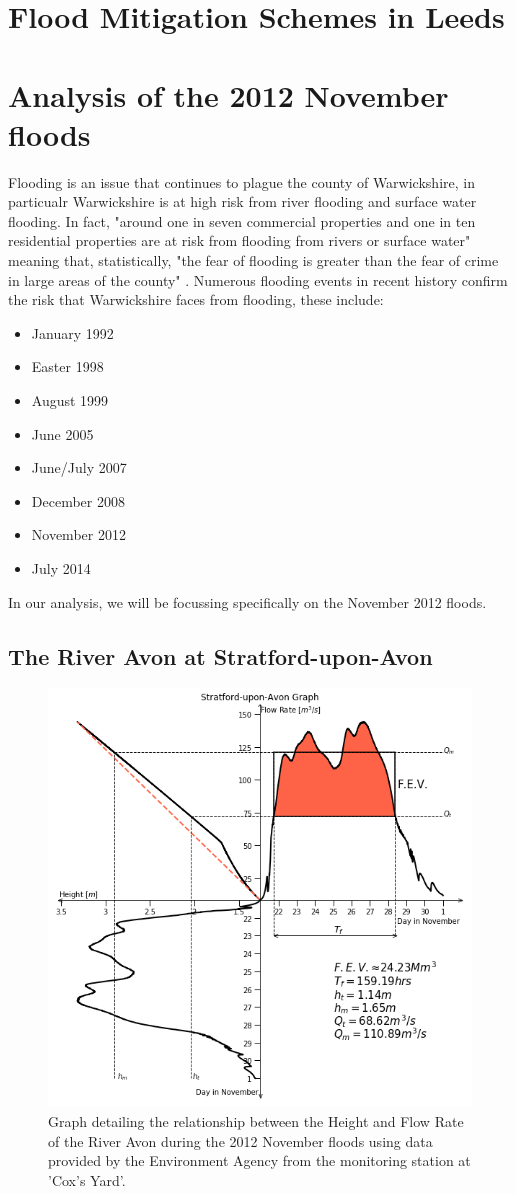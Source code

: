 \documentclass[11 pt, a4paper]{article}
\begin{document}
\newpage
\section{Flood Mitigation Schemes in Leeds}

\newpage
\section{Analysis of the 2012 November floods}
Flooding is an issue that continues to plague the county of Warwickshire, in particualr Warwickshire is at high risk from river flooding and surface water flooding. In fact, "around one in seven commercial properties and one in ten residential properties are at risk from flooding from rivers or surface water" \cite{5} meaning that, statistically, "the fear of flooding is greater than the fear of crime in large areas of the county" \cite{5}. Numerous flooding events in recent history confirm the risk that Warwickshire faces from flooding, these include:
\begin{itemize}
\item January 1992
\item Easter 1998
\item August 1999
\item June 2005
\item June/July 2007
\item December 2008
\item November 2012
\item July 2014
\end{itemize}
In our analysis, we will be focussing specifically on the November 2012 floods.

\subsection{The River Avon at Stratford-upon-Avon}
\begin{figure}[H]
\begin{center}
\includegraphics[width=.5\linewidth]{Stratford-Quadrant_Graph.png}
\caption{Graph detailing the relationship between the Height and Flow Rate of the River Avon during the 2012 November floods using data provided by the Environment Agency from the monitoring station at 'Cox's Yard'.}
\end{center}
\end{figure}
\end{document}
